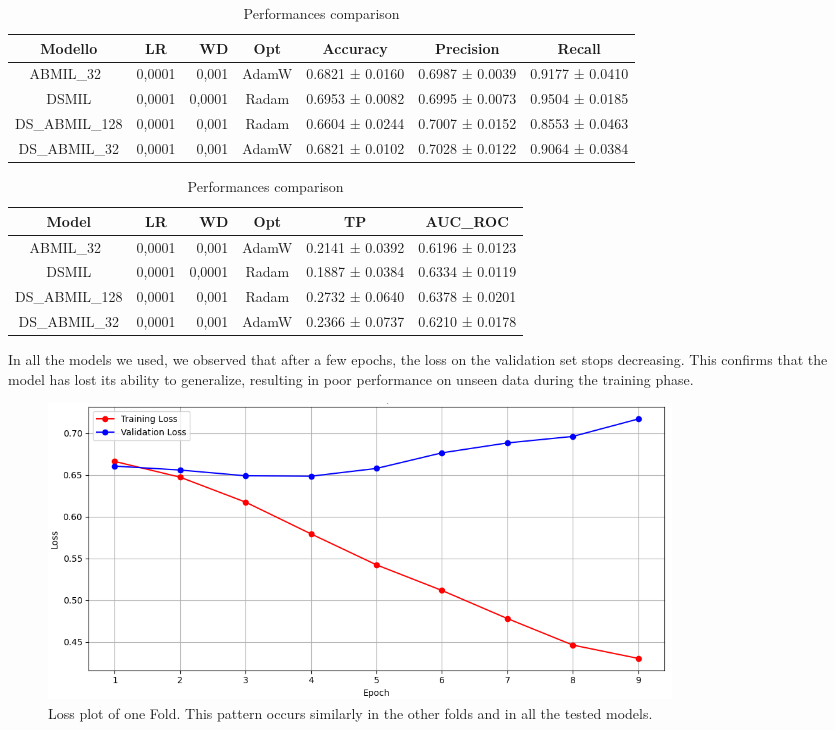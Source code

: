 \documentclass{article}
\begin{document}
\begin{table}[h]
	\centering
	\begin{tabular}{|c|crc|c|c|c|}
		\hline
		Modello & LR & WD & Opt & Accuracy & Precision & Recall \\
		\hline
		ABMIL\_32\ & 0,0001 & 0,001 & AdamW & 0.6821 ± 0.0160 & 0.6987 ± 0.0039 & 0.9177 ± 0.0410 \\
		DSMIL & 0,0001 & 0,0001 & Radam & 0.6953 ± 0.0082 & 0.6995 ± 0.0073 & 0.9504 ± 0.0185 \\
		DS\_ABMIL\_128 & 0,0001 & 0,001 & Radam & 0.6604 ± 0.0244 & 0.7007 ± 0.0152 & 0.8553 ± 0.0463 \\
		DS\_ABMIL\_32 & 0,0001 & 0,001 & AdamW & 0.6821 ± 0.0102 & 0.7028 ± 0.0122 & 0.9064 ± 0.0384 \\
		\hline
	\end{tabular}
	\begin{tabular}{|c|crc|c|c|}
		\hline
		Model & LR & WD & Opt & TP & AUC\_ROC \\
		\hline
		ABMIL\_32\ & 0,0001 & 0,001 & AdamW & 0.2141 ± 0.0392&0.6196 ± 0.0123\\
		DSMIL & 0,0001 & 0,0001 & Radam & 0.1887 ± 0.0384 & 0.6334 ± 0.0119 \\
		DS\_ABMIL\_128 & 0,0001 & 0,001 & Radam & 0.2732 ± 0.0640 & 0.6378 ± 0.0201 \\
		DS\_ABMIL\_32 & 0,0001 & 0,001 & AdamW & 0.2366 ± 0.0737 & 0.6210 ± 0.0178 \\
		\hline
	\end{tabular}
	
	\caption{Performances comparison}
\end{table}
In all the models we used, we observed that after a few epochs, the loss on the validation set stops decreasing. This confirms that the model has lost its ability to generalize, resulting in poor performance on unseen data during the training phase.

\begin{figure}[h]
	\centering
	\includegraphics[width=0.8\textwidth]{images/loss_plot_DS_ABMIL_128.png}
	\caption{Loss plot of one Fold. This pattern occurs similarly in the other folds and in all the tested models.}
\end{figure}
\end{document}
